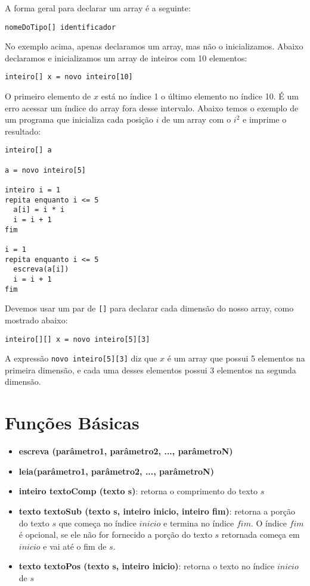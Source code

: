 \documentclass{report}
\begin{document}
A forma geral para declarar um array é a seguinte: 
\begin{verbatim}
nomeDoTipo[] identificador
\end{verbatim}

No exemplo acima, apenas declaramos um array, mas não o
inicializamos. Abaixo declaramos e inicializamos um
array de inteiros com 10 elementos:
\begin{verbatim}
inteiro[] x = novo inteiro[10]
\end{verbatim}

O primeiro elemento de $x$ está no índice 1 o último
elemento no índice 10. É um erro acessar um índice do
array fora desse intervalo. Abaixo temos o exemplo de
um programa que inicializa cada posição $i$ de um array
com o $i^2$ e imprime o resultado:
\begin{verbatim}
inteiro[] a

a = novo inteiro[5]

inteiro i = 1
repita enquanto i <= 5
  a[i] = i * i
  i = i + 1
fim

i = 1
repita enquanto i <= 5
  escreva(a[i])
  i = i + 1
fim
\end{verbatim}


Devemos usar um par de \texttt{[]} para declarar cada dimensão
do nosso array, como mostrado abaixo: 
\begin{verbatim}
inteiro[][] x = novo inteiro[5][3]
\end{verbatim}

A expressão \texttt{novo inteiro[5][3]} diz que $x$ é um
array que possui 5 elementos na primeira dimensão, e cada
uma desses elementos possui 3 elementos na segunda dimensão.


\section{Funções Básicas}

\begin{itemize}
	\item \textbf{escreva (parâmetro1, parâmetro2, ..., parâmetroN)}
	
	\item \textbf{leia(parâmetro1, parâmetro2, ..., parâmetroN)}
	
	\item \textbf{inteiro textoComp (texto s)}: retorna o comprimento do texto $s$
	
	\item \textbf{texto textoSub (texto s, inteiro inicio, inteiro fim)}:
	retorna a porção do texto $s$ que começa no índice $inicio$ e termina
  no índice $fim$. O índice $fim$ é opcional, se ele não for fornecido a
  porção do texto $s$ retornada começa em $inicio$ e vai até o fim de $s$.
	
	\item \textbf{texto textoPos (texto s, inteiro inicio)}:
	retorna o texto no índice $inicio$ de $s$
\end{itemize}
\end{document}
